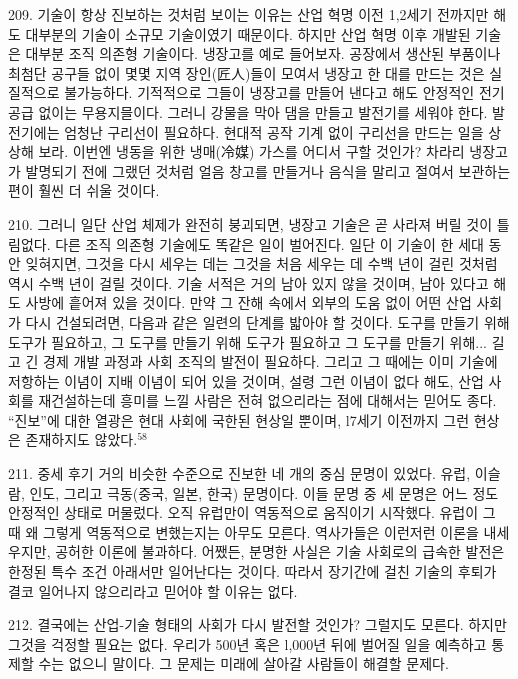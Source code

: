 \documentclass[11pt,a4paper]{article}
\begin{document}
\begin{multicols}{2}
209. 기술이 항상 진보하는 것처럼 보이는 이유는 산업 혁명 이전 1,2세기 전까지만 해도 대부분의  기술이 소규모 기술이였기 때문이다. 하지만 산업 혁명 이후 개발된 기술은 대부분 조직 의존형 기술이다. 냉장고를 예로 들어보자. 공장에서 생산된 부품이나 최첨단 공구들 없이 몇몇 지역 장인(匠人)들이  모여서 냉장고 한 대를 만드는 것은 실질적으로 불가능하다. 기적적으로 그들이 냉장고를 만들어 낸다고  해도 안정적인 전기 공급 없이는 무용지믈이다. 그러니 강물을 막아 댐을 만들고 발전기를 세워야 한다.  발전기에는 엄청난 구리선이 필요하다. 현대적 공작 기계 없이 구리선을 만드는 일을 상상해 보라. 이번엔 냉동을 위한 냉매(冷媒) 가스를 어디서 구할 것인가? 차라리 냉장고가 발명되기 전에 그랬던 것처럼 얼음 창고를 만들거나 음식을 말리고 절여서 보관하는 편이 훨씬 더 쉬울 것이다.  


210. 그러니 일단 산업 체제가 완전히 붕괴되면, 냉장고 기술은 곧 사라져 버릴 것이 틀림없다. 다른 조직 의존형 기술에도 똑같은 일이 벌어진다. 일단 이 기술이 한 세대 동안 잊혀지면, 그것을 다시 세우는 데는  그것을 처음 세우는 데 수백 년이 걸린 것처럼 역시 수백 년이 걸릴 것이다. 기술 서적은 거의 남아 있지  않을 것이며, 남아 있다고 해도 사방에 흩어져 있을 것이다. 만약 그 잔해 속에서 외부의 도움 없이 어떤 산업 사회가 다시 건설되려면, 다음과 같은 일련의 단계를 밟아야 할 것이다. 도구를 만들기 위해 도구가  필요하고, 그 도구를 만들기 위해 도구가 필요하고 그 도구를 만들기 위해... 길고 긴 경제 개발 과정과 
사회 조직의 발전이 필요하다. 그리고 그 때에는 이미 기술에 저항하는 이념이 지배 이념이 되어 있을  것이며, 설령 그런 이념이 없다 해도, 산업 사회를 재건설하는데 흥미를 느낄 사람은 전혀 없으리라는  점에 대해서는 믿어도 종다. “진보”에 대한 열광은 현대 사회에 국한된 현상일 뿐이며, l7세기 이전까지  그런 현상은 존재하지도 않았다.\hyperlink{58}{$^{58}$}


211. 중세 후기 거의 비슷한 수준으로 진보한 네 개의 중심 문명이 있었다. 유럽, 이슬람, 인도, 그리고  극동(중국, 일본, 한국) 문명이다. 이들 문명 중 세 문명은 어느 정도 안정적인 상태로 머물렀다. 오직 유럽만이 역동적으로 움직이기 시작했다. 유럽이 그 때 왜 그렇게 역동적으로 변했는지는 아무도 모른다.  역사가들은 이런저런 이론을 내세우지만, 공허한 이론에 불과하다. 어쨌든, 분명한 사실은 기술 사회로의  급속한 발전은 한정된 특수 조건 아래서만 일어난다는 것이다. 따라서 장기간에 걸친 기술의 후퇴가 결코 일어나지 않으리라고 믿어야 할 이유는 없다.  


212. 결국에는 산업-기술 형태의 사회가 다시 발전할 것인가? 그럴지도 모른다. 하지만 그것을 걱정할  필요는 없다. 우리가 500년 혹은 l,000년 뒤에 벌어질 일을 예측하고 통제할 수는 없으니 말이다. 그  문제는 미래에 살아갈 사람들이 해결할 문제다.



\end{multicols}
\end{document}
